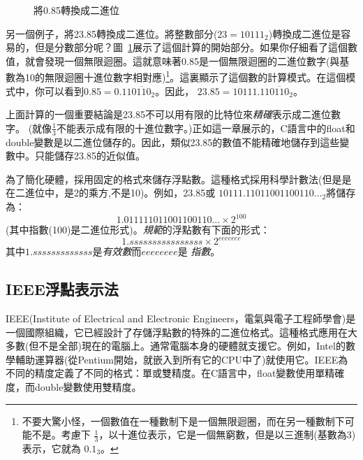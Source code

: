 \begin{figure}[t]
\centering
{}
\caption{將0.85轉換成二進位\label{fig:binConvert2}}
\end{figure}

另一個例子，將23.85轉換成二進位。將整數部分($23 = 10111_2$)轉換成二進位是容易的，但是分數部分呢？圖~\ref{fig:binConvert2}展示了這個計算的開始部分。如果你仔細看了這個數值，就會發現一個無限迴圈。這就意味著0.85是一個無限迴圈的二進位數字(與基數為10的無限迴圈十進位數字相對應)\footnote{不要大驚小怪，一個數值在一種數制下是一個無限迴圈，而在另一種數制下可能不是。考慮下
$\frac{1}{3}$，以十進位表示，它是一個無窮數，但是以三進制(基數為3)表示，它就為
$0.1_3$。}。這裏顯示了這個數的計算模式。在這個模式中，你可以看到$0.85 = 0.11\overline{0110}_2$。因此，
$23.85 = 10111.11\overline{0110}_2$。

上面計算的一個重要結論是23.85不可以用有限的比特位來\emph{精確}表示成二進位數字。
(就像$\frac{1}{3}$不能表示成有限的十進位數字。)正如這一章展示的，C語言中的{\code float}和{\code double}變數是以二進位儲存的。因此，類似23.85的數值不能精確地儲存到這些變數中。只能儲存23.85的近似值。

為了簡化硬體，採用固定的格式來儲存浮點數。這種格式採用科學計數法(但是是在二進位中，是2的乘方,不是10)。例如，23.85或 $10111.11011001100110\ldots_2$將儲存為：
\[ 1.011111011001100110\ldots \times 2^{100} \]
(其中指數(100)是二進位形式)。\emph{規範}的浮點數有下面的形式：
\[ 1.ssssssssssssssss \times 2^{eeeeeee} \]
其中$1.sssssssssssss$是\emph{有效數}而$eeeeeeee$是
\emph{指數}。

\subsection{IEEE浮點表示法}

IEEE(Institute of Electrical and Electronic Engineers，電氣與電子工程師學會)是一個國際組織，它已經設計了存儲浮點數的特殊的二進位格式。這種格式應用在大多數(但不是全部)現在的電腦上。通常電腦本身的硬體就支援它。例如，Intel的數學輔助運算器(從Pentium開始，就嵌入到所有它的CPU中了)就使用它。IEEE為不同的精度定義了不同的格式：單或雙精度。在C語言中，{\code float}變數使用單精確度，而{\code double}變數使用雙精度。

